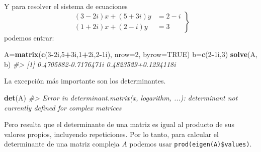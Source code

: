 \documentclass[
]{book}
\newenvironment{Shaded}{\begin{snugshade}}{\end{snugshade}}
\newcommand{\CommentTok}[1]{\textcolor[rgb]{0.56,0.35,0.01}{\textit{#1}}}
\newcommand{\DataTypeTok}[1]{\textcolor[rgb]{0.13,0.29,0.53}{#1}}
\newcommand{\DecValTok}[1]{\textcolor[rgb]{0.00,0.00,0.81}{#1}}
\newcommand{\KeywordTok}[1]{\textcolor[rgb]{0.13,0.29,0.53}{\textbf{#1}}}
\newcommand{\NormalTok}[1]{#1}
\newcommand{\OperatorTok}[1]{\textcolor[rgb]{0.81,0.36,0.00}{\textbf{#1}}}
\newcommand{\OtherTok}[1]{\textcolor[rgb]{0.56,0.35,0.01}{#1}}
\theoremstyle{definition}
\theoremstyle{definition}
\theoremstyle{definition}
\theoremstyle{remark}
\begin{document}
Y para resolver el sistema de ecuaciones
\[
\left.
\begin{array}{rl} 
(3-2i)x+(5+3i)y & = 2-i\\
(1+2i)x+(2-i)y & = 3 
\end{array}
\right\}
\]
podemos entrar:

\begin{Shaded}
\begin{Highlighting}[]
\NormalTok{A=}\KeywordTok{matrix}\NormalTok{(}\KeywordTok{c}\NormalTok{(}\DecValTok{3}\OperatorTok{{-}}\NormalTok{2i,}\DecValTok{5}\OperatorTok{+}\NormalTok{3i,}\DecValTok{1}\OperatorTok{+}\NormalTok{2i,}\DecValTok{2}\OperatorTok{{-}}\NormalTok{1i), }\DataTypeTok{nrow=}\DecValTok{2}\NormalTok{, }\DataTypeTok{byrow=}\OtherTok{TRUE}\NormalTok{)}
\NormalTok{b=}\KeywordTok{c}\NormalTok{(}\DecValTok{2}\OperatorTok{{-}}\NormalTok{1i,}\DecValTok{3}\NormalTok{)}
\KeywordTok{solve}\NormalTok{(A, b)}
\CommentTok{\#\textgreater{} [1] 0.4705882{-}0.7176471i 0.4823529+0.1294118i}
\end{Highlighting}
\end{Shaded}

La excepción más importante son los determinantes.

\begin{Shaded}
\begin{Highlighting}[]
\KeywordTok{det}\NormalTok{(A)}
\CommentTok{\#\textgreater{} Error in determinant.matrix(x, logarithm, ...): \textquotesingle{}determinant\textquotesingle{} not currently defined for complex matrices}
\end{Highlighting}
\end{Shaded}

Pero resulta que el determinante de una matriz es igual al producto de sus valores propios, incluyendo repeticiones. Por lo tanto, para calcular el determinante de una matriz compleja \(A\) podemos usar \texttt{prod(eigen(A)\$values)}.

\begin{Shaded}
\end{Shaded}
\end{document}
